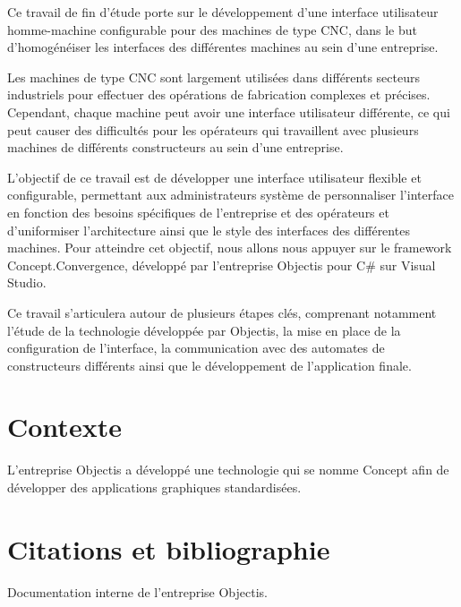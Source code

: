 Ce travail de fin d'étude porte sur le développement d'une interface utilisateur homme-machine configurable pour des machines de type CNC, dans le but d'homogénéiser les interfaces des différentes machines au sein d'une entreprise.

Les machines de type CNC sont largement utilisées dans différents secteurs industriels pour effectuer des opérations de fabrication complexes et précises. Cependant, chaque machine peut avoir une interface utilisateur différente, ce qui peut causer des difficultés pour les opérateurs qui travaillent avec plusieurs machines de différents constructeurs au sein d'une entreprise.

L'objectif de ce travail est de développer une interface utilisateur flexible et configurable, permettant aux administrateurs système de personnaliser l'interface en fonction des besoins spécifiques de l'entreprise et des opérateurs et d'uniformiser l'architecture ainsi que le style des interfaces des différentes machines. Pour atteindre cet objectif, nous allons nous appuyer sur le framework Concept.Convergence, développé par l'entreprise Objectis pour C\# sur Visual Studio.


Ce travail s'articulera autour de plusieurs étapes clés, comprenant notamment l'étude de la technologie développée par Objectis, la mise en place de la configuration de l'interface, la communication avec des automates de constructeurs différents ainsi que le développement de l'application finale.
\section{Contexte}
L'entreprise Objectis a développé une technologie qui se nomme Concept afin de développer des applications graphiques standardisées.

\section{Citations et bibliographie}
Documentation interne de l'entreprise Objectis.


